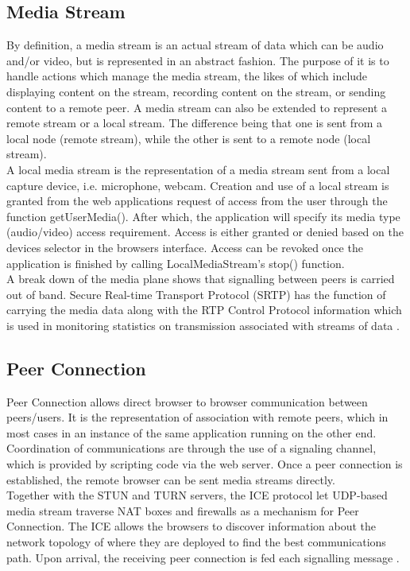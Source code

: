 \subsection{Media Stream}
By definition, a media stream is an actual stream of data which can be audio and/or video, but is represented in an abstract fashion. The purpose of it is to handle actions which manage the media stream, the likes of which include displaying content on the stream, recording content on the stream, or sending content to a remote peer. A media stream can also be extended to represent a remote stream or a local stream. The difference being that one is sent from a local node (remote stream), while the other is sent to a remote node (local stream).
\\ A local media stream is the representation of a media stream sent from a local capture device, i.e. microphone, webcam. Creation and use of a local stream is granted from the web applications request of access from the user through the function getUserMedia(). After which, the application will specify its media type (audio/video) access requirement. Access is either granted or denied based on the devices selector in the browsers interface. Access can be revoked once the application is finished by calling LocalMediaStream’s stop() function.
\\  A break down of the media plane shows that signalling between peers is carried out of band. Secure Real-time Transport Protocol (SRTP) has the function of carrying the media data along with the RTP Control Protocol information which is used in monitoring statistics on transmission associated with streams of data \cite{loreto2014real}.

\subsection{Peer Connection}
Peer Connection allows direct browser to browser communication between peers/users. It is the representation of association with remote peers, which in most cases in an instance of the same application running on the other end. Coordination of communications are through the use of a signaling channel, which is provided by scripting code via the web server. Once a peer connection is established, the remote browser can be sent media streams directly.
\\ Together with the STUN and TURN servers, the ICE protocol let UDP-based media stream traverse NAT boxes and firewalls as a mechanism for Peer Connection. The ICE allows the browsers to discover information about the network topology of where they are deployed to find the best communications path. Upon arrival, the receiving peer connection is fed each signalling message \cite{loreto2014real}.

